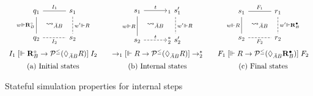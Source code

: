 \documentclass[acmsmall,screen,review,anonymous]{acmart}
\newcommand{\ifr}[1]{\mathrel{[{#1}]}}
\newcommand{\que}{\circ}
\newcommand{\ans}{\bullet}
\begin{document}
\begin{figure} %
  \small
  \[
    \begin{array}{c@{\qquad}c@{\qquad}c}
      \begin{tikzcd}[sep=tiny,column sep=0]
        q_1 \ar[dd, "w \Vdash \mathbf{R}_B^\que"', dash] \ar[rr, dash, "I_1"] &&
        s_1 \ar[dd, "w' \Vdash R", dash, dashed] \\
        & \leadsto_{\bar{A}B} & \\
        q_2 \ar[rr, "I_2"', dash, dashed] &&
        s_2
      \end{tikzcd}
      &
      \begin{tikzcd}[sep=tiny,column sep=0]
        s_1 \ar[rr, "t"] \ar[dd, "w \Vdash R"', dash] &&
        \!\!{}_1 \:\, s_1' \ar[dd, "w' \Vdash R", dash, dashed] \\
        & \leadsto_{\bar{A}B} & \\
        s_2 \ar[rr, "t", dashed] &&
        \!\!{}_2^* \:\, s_2'
      \end{tikzcd}
      &
      \begin{tikzcd}[sep=tiny, column sep=0]
        s_1 \ar[rr, "F_1", dash] \ar[dd, "w \Vdash R"', dash] &&
        r_1 \ar[dd, "w' \Vdash \mathbf{R}_B^\ans", dash, dashed] \\
        & \leadsto_{\bar{A}B} & \\
        s_2 \ar[rr, "F_2"', dash, dashed] &&
        r_2
      \end{tikzcd}
      \vspace{1ex} \\
      I_1 \ifr{\Vdash \mathbf{R}_B^\que \rightarrow
        \mathcal{P}^\le(\Diamond_{\bar{A}B} R)} I_2
      &
      {\rightarrow_1}
      \ifr{\Vdash R \rightarrow \mathcal{P}^\le(\Diamond_{\bar{A}B} R)}
      {\rightarrow_2^*}
      &
      F_1
      \ifr{\Vdash R \rightarrow \mathcal{P}^\le(\Diamond_{\bar{A}B} \mathbf{R}_B^\ans)}
      F_2
      \vspace{1.2ex} \\
      \text{(a) Initial states} &
      \text{(b) Internal states} &
      \text{(c) Final states}
    \end{array}
  \]
  \caption{Stateful simulation properties for internal steps}
  \label{fig:simint}
\end{figure}
\end{document}
